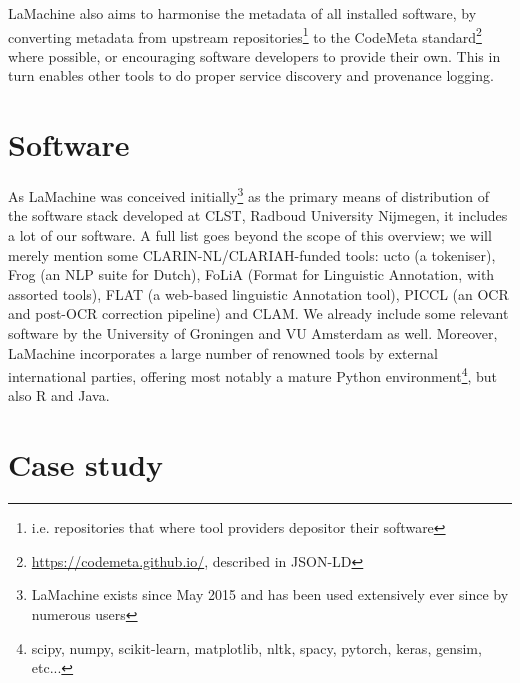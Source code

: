 \documentclass[a4paper,11pt]{article}
\begin{document}
LaMachine also aims to harmonise the metadata of all installed software, by converting metadata from upstream
repositories\footnote{i.e. repositories that where tool providers depositor their software} to
the CodeMeta standard\footnote{\url{https://codemeta.github.io/}, described in JSON-LD} \cite{codemeta,codemetar} where possible, or encouraging software developers to provide
their own. This in turn enables other tools to do proper service discovery and provenance logging.

\section{Software}

As LaMachine was conceived initially\footnote{LaMachine exists since May 2015 and has been used extensively ever since by
numerous users} as the primary means of distribution of the software stack developed at CLST,
Radboud University Nijmegen, it includes a lot of our software. A full list goes beyond the scope of this overview; we
will merely mention some CLARIN-NL/CLARIAH-funded tools: ucto (a tokeniser), Frog (an NLP suite for Dutch), FoLiA (Format
for Linguistic Annotation, with assorted tools), FLAT (a web-based linguistic Annotation tool), PICCL (an OCR and
post-OCR correction pipeline) and CLAM. We already include some relevant software by the University of Groningen and VU
Amsterdam as well. Moreover, LaMachine incorporates a large number of renowned tools by external international parties,
offering most notably a mature Python environment\footnote{scipy, numpy, scikit-learn, matplotlib, nltk, spacy, pytorch,
keras, gensim, etc...}, but also R and Java.


\section{Case study}\label{sec-case}
\end{document}
